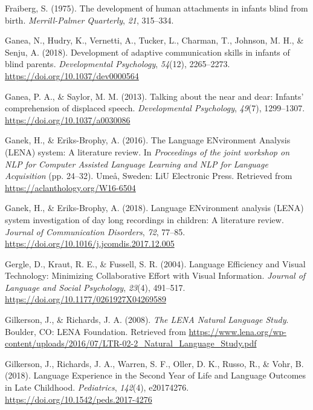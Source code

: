 \documentclass[
  man]{apa6}
\newlength{\cslhangindent}
\newlength{\cslentryspacingunit} %
\newenvironment{CSLReferences}[2] %
 {%
  \setlength{\parindent}{0pt}
  \ifodd #1
  \let\oldpar\par
  \def\par{\hangindent=\cslhangindent\oldpar}
  \fi
  \setlength{\parskip}{#2\cslentryspacingunit}
 }%
 {}
\begin{document}
\begin{CSLReferences}{1}{0}
\leavevmode{}%
Fraiberg, S. (1975). The development of human attachments in infants blind from birth. \emph{Merrill-Palmer Quarterly}, \emph{21}, 315--334.

\leavevmode{}%
Ganea, N., Hudry, K., Vernetti, A., Tucker, L., Charman, T., Johnson, M. H., \& Senju, A. (2018). Development of adaptive communication skills in infants of blind parents. \emph{Developmental Psychology}, \emph{54}(12), 2265--2273. \url{https://doi.org/10.1037/dev0000564}

\leavevmode{}%
Ganea, P. A., \& Saylor, M. M. (2013). Talking about the near and dear: {Infants}' comprehension of displaced speech. \emph{Developmental Psychology}, \emph{49}(7), 1299--1307. \url{https://doi.org/10.1037/a0030086}

\leavevmode{}%
Ganek, H., \& Eriks-Brophy, A. (2016). The {Language} {ENvironment} {Analysis} ({LENA}) system: {A} literature review. In \emph{Proceedings of the joint workshop on {NLP} for {Computer} {Assisted} {Language} {Learning} and {NLP} for {Language} {Acquisition}} (pp. 24--32). Umeå, Sweden: LiU Electronic Press. Retrieved from \url{https://aclanthology.org/W16-6504}

\leavevmode{}%
Ganek, H., \& Eriks-Brophy, A. (2018). Language {ENvironment} analysis ({LENA}) system investigation of day long recordings in children: {A} literature review. \emph{Journal of Communication Disorders}, \emph{72}, 77--85. \url{https://doi.org/10.1016/j.jcomdis.2017.12.005}

\leavevmode{}%
Gergle, D., Kraut, R. E., \& Fussell, S. R. (2004). Language {Efficiency} and {Visual} {Technology}: {Minimizing} {Collaborative} {Effort} with {Visual} {Information}. \emph{Journal of Language and Social Psychology}, \emph{23}(4), 491--517. \url{https://doi.org/10.1177/0261927X04269589}

\leavevmode{}%
Gilkerson, J., \& Richards, J. A. (2008). \emph{The {LENA} {Natural} {Language} {Study}}. Boulder, CO: LENA Foundation. Retrieved from \url{https://www.lena.org/wp-content/uploads/2016/07/LTR-02-2_Natural_Language_Study.pdf}

\leavevmode{}%
Gilkerson, J., Richards, J. A., Warren, S. F., Oller, D. K., Russo, R., \& Vohr, B. (2018). Language {Experience} in the {Second} {Year} of {Life} and {Language} {Outcomes} in {Late} {Childhood}. \emph{Pediatrics}, \emph{142}(4), e20174276. \url{https://doi.org/10.1542/peds.2017-4276}


\end{CSLReferences}
\end{document}
